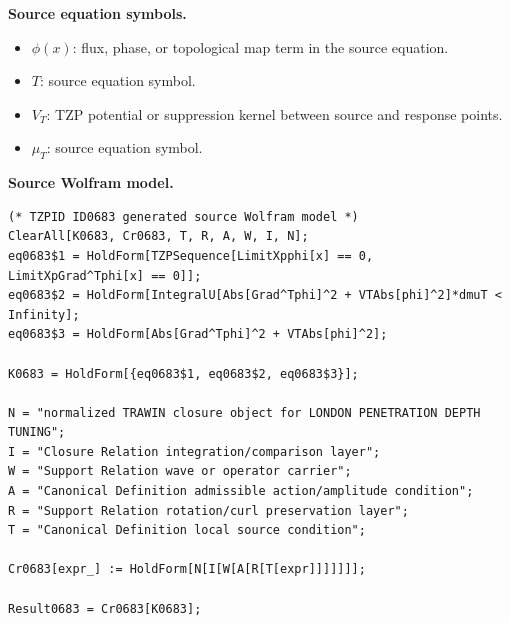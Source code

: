 \begin{minipage}[t]{0.49\linewidth}
\begingroup
\small
\raggedright
\textbf{Source equation symbols.}\par
\begin{itemize}[leftmargin=1.35em,itemsep=1pt,topsep=1pt,parsep=0pt]
    \item $\phi(x)$: flux, phase, or topological map term in the source equation.
    \item $T$: source equation symbol.
    \item $V_T$: TZP potential or suppression kernel between source and response points.
    \item $\mu_T$: source equation symbol.
\end{itemize}
\endgroup
\end{minipage}\hfill
\begin{minipage}[t]{0.47\linewidth}
\begingroup
\scriptsize
\raggedright
\textbf{Source Wolfram model.}\par
\begin{Verbatim}[fontsize=\tiny,breaklines=true,breakanywhere=true]
(* TZPID ID0683 generated source Wolfram model *)
ClearAll[K0683, Cr0683, T, R, A, W, I, N];
eq0683$1 = HoldForm[TZPSequence[LimitXpphi[x] == 0, LimitXpGrad^Tphi[x] == 0]];
eq0683$2 = HoldForm[IntegralU[Abs[Grad^Tphi]^2 + VTAbs[phi]^2]*dmuT < Infinity];
eq0683$3 = HoldForm[Abs[Grad^Tphi]^2 + VTAbs[phi]^2];

K0683 = HoldForm[{eq0683$1, eq0683$2, eq0683$3}];

N = "normalized TRAWIN closure object for LONDON PENETRATION DEPTH TUNING";
I = "Closure Relation integration/comparison layer";
W = "Support Relation wave or operator carrier";
A = "Canonical Definition admissible action/amplitude condition";
R = "Support Relation rotation/curl preservation layer";
T = "Canonical Definition local source condition";

Cr0683[expr_] := HoldForm[N[I[W[A[R[T[expr]]]]]]];

Result0683 = Cr0683[K0683];
\end{Verbatim}
\endgroup
\end{minipage}

